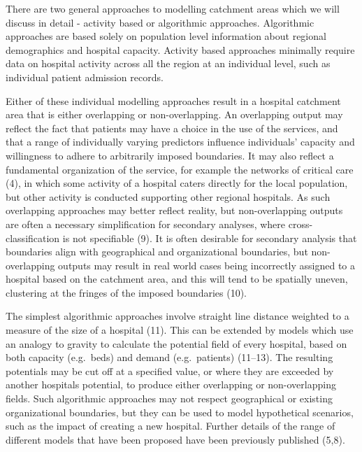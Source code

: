 \documentclass[
]{article}
\begin{document}
There are two general approaches to modelling catchment areas which we
will discuss in detail - activity based or algorithmic approaches.
Algorithmic approaches are based solely on population level information
about regional demographics and hospital capacity. Activity based
approaches minimally require data on hospital activity across all the
region at an individual level, such as individual patient admission
records.

Either of these individual modelling approaches result in a hospital
catchment area that is either overlapping or non-overlapping. An
overlapping output may reflect the fact that patients may have a choice
in the use of the services, and that a range of individually varying
predictors influence individuals' capacity and willingness to adhere to
arbitrarily imposed boundaries. It may also reflect a fundamental
organization of the service, for example the networks of critical care
(4), in which some activity of a hospital caters directly for the local
population, but other activity is conducted supporting other regional
hospitals. As such overlapping approaches may better reflect reality,
but non-overlapping outputs are often a necessary simplification for
secondary analyses, where cross-classification is not specifiable (9).
It is often desirable for secondary analysis that boundaries align with
geographical and organizational boundaries, but non-overlapping outputs
may result in real world cases being incorrectly assigned to a hospital
based on the catchment area, and this will tend to be spatially uneven,
clustering at the fringes of the imposed boundaries (10).

The simplest algorithmic approaches involve straight line distance
weighted to a measure of the size of a hospital (11). This can be
extended by models which use an analogy to gravity to calculate the
potential field of every hospital, based on both capacity (e.g.~beds)
and demand (e.g.~patients) (11--13). The resulting potentials may be cut
off at a specified value, or where they are exceeded by another
hospitals potential, to produce either overlapping or non-overlapping
fields. Such algorithmic approaches may not respect geographical or
existing organizational boundaries, but they can be used to model
hypothetical scenarios, such as the impact of creating a new hospital.
Further details of the range of different models that have been proposed
have been previously published (5,8).
\end{document}
